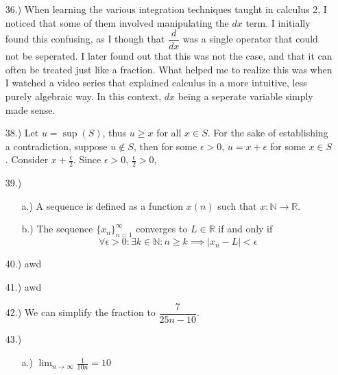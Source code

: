 \documentclass[12pt]{article}
\begin{document}
\begin{itemize}

    \item [36.)] When learning the various integration techniques taught in calculus 2, I noticed that some of them involved manipulating the $dx$ term. I initially found this confusing, as I though that $\dfrac{d}{dx}$ was a single operator that could not be seperated. I later found out that this was not the case, and that it can often be treated just like a fraction. What helped me to realize this was when I watched a video series that explained calculus in a more intuitive, less purely algebraic way. In this context, $dx$ being a seperate variable simply made sense.


    \item [38.)] Let $u=\sup(S)$, thus $u\geq x$ for all $x\in S$. For the sake of establishing a contradiction, suppose $u\notin S$, then for some $\epsilon>0$, $u=x+\epsilon$ for some $x\in S$. Consider $x+\frac{\epsilon}{2}$. Since $\epsilon>0$, $\frac{\epsilon}{2}>0$,

    \item [39.)] \begin{itemize}
        \item [a.)] A sequence is defined as a function $x(n)$ such that $x:\mathbb{N}\rightarrow\mathbb{R}$.

        \item [b.)] The sequence $\{x_n\}^\infty_{n=1}$ converges to $L\in\mathbb{R}$ if and only if
        \[\forall\epsilon>0:\exists k\in\mathbb{N}:n\geq k\implies\vert x_n-L\vert<\epsilon\]
    \end{itemize}

    \item [40.)] awd

    \item [41.)] awd

    \item [42.)] We can simplify the fraction to $\dfrac{7}{25n-10}$.

    \item [43.)] \begin{itemize}
        \item [a.)] $\displaystyle\lim_{n\to\infty}\frac{1}{10n}=10$


\end{itemize}
\end{itemize}
\end{document}
